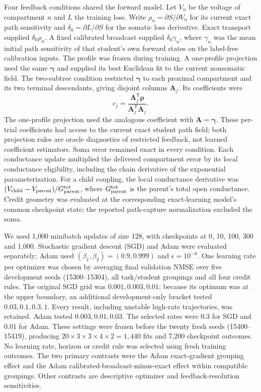 Four feedback conditions shared the forward model. Let $V_n$ be the voltage of compartment $n$ and $L$ the training loss. Write $\rho_n=\partial S/\partial V_n$ for its current exact path sensitivity and $\delta_0=\partial L/\partial S$ for the somatic loss derivative. Exact transport supplied $\delta_0\rho_n$. A fixed calibrated broadcast supplied $\delta_0\gamma_n$, where $\gamma_n$ was the mean initial path sensitivity of that student's own forward states on the label-free calibration inputs. The profile was frozen during training. A one-profile projection used the same $\bm\gamma$ and supplied its best Euclidean fit to the current nonsomatic field. The two-subtree condition restricted $\bm\gamma$ to each proximal compartment and its two terminal descendants, giving disjoint columns $\bm A_j$. Its coefficients were
\begin{equation}
c_j=\frac{\bm A_j^{\mathsf T}\bm\rho}
 {\bm A_j^{\mathsf T}\bm A_j}.
\end{equation}
The one-profile projection used the analogous coefficient with $\bm A=\bm\gamma$. These per-trial coefficients had access to the current exact student path field; both projection rules are oracle diagnostics of restricted feedback, not learned coefficient estimators. Soma error remained exact in every condition. Each conductance update multiplied the delivered compartment error by its local conductance eligibility, including the chain derivative of the exponential parameterization. For a child coupling, the local conductance derivative was $(V_{\rm child}-V_{\rm parent})/G_{\rm parent}^{\rm tot}$, where $G_{\rm parent}^{\rm tot}$ is the parent's total open conductance. Credit geometry was evaluated at the corresponding exact-learning model's common checkpoint state; the reported path-capture normalization excluded the soma.

We used 1,000 minibatch updates of size 128, with checkpoints at 0, 10, 100, 300 and 1,000. Stochastic gradient descent (SGD) and Adam were evaluated separately; Adam used $(\beta_1,\beta_2)=(0.9,0.999)$ and $\epsilon=10^{-8}$. One learning rate per optimizer was chosen by averaging final validation NMSE over five development seeds (15300--15304), all task/student groupings and all four credit rules. The original SGD grid was $0.001,0.003,0.01$; because its optimum was at the upper boundary, an additional development-only bracket tested $0.03,0.1,0.3,1$. Every result, including unstable high-rate trajectories, was retained. Adam tested $0.003,0.01,0.03$. The selected rates were $0.3$ for SGD and $0.01$ for Adam. These settings were frozen before the twenty fresh seeds (15400--15419), producing $20\times3\times3\times4\times2=1,440$ fits and 7,200 checkpoint outcomes. No learning rate, horizon or credit rule was selected using fresh training outcomes. The two primary contrasts were the Adam exact-gradient grouping effect and the Adam calibrated-broadcast-minus-exact effect within compatible groupings. Other contrasts are descriptive optimizer and feedback-resolution sensitivities.

